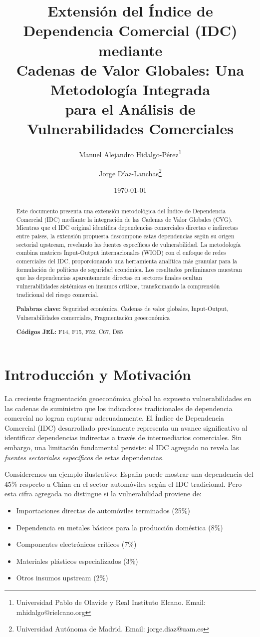\documentclass[12pt,a4paper]{article}
\title{\textbf{Extensión del Índice de Dependencia Comercial (IDC) mediante\\Cadenas de Valor Globales: Una Metodología Integrada\\para el Análisis de Vulnerabilidades Comerciales}}
\author{Manuel Alejandro Hidalgo-Pérez\thanks{Universidad Pablo de Olavide y Real Instituto Elcano. Email: mhidalgo@rielcano.org} \and Jorge Díaz-Lanchas\thanks{Universidad Autónoma de Madrid. Email: jorge.diaz@uam.es}}
\date{\today}
\begin{document}
\maketitle

\begin{abstract}
Este documento presenta una extensión metodológica del Índice de Dependencia Comercial (IDC) mediante la integración de las Cadenas de Valor Globales (CVG). Mientras que el IDC original identifica dependencias comerciales directas e indirectas entre países, la extensión propuesta descompone estas dependencias según su origen sectorial upstream, revelando las fuentes específicas de vulnerabilidad. La metodología combina matrices Input-Output internacionales (WIOD) con el enfoque de redes comerciales del IDC, proporcionando una herramienta analítica más granular para la formulación de políticas de seguridad económica. Los resultados preliminares muestran que las dependencias aparentemente directas en sectores finales ocultan vulnerabilidades sistémicas en insumos críticos, transformando la comprensión tradicional del riesgo comercial.

\textbf{Palabras clave:} Seguridad económica, Cadenas de valor globales, Input-Output, Vulnerabilidades comerciales, Fragmentación geoeconómica

\textbf{Códigos JEL:} F14, F15, F52, C67, D85
\end{abstract}

\section{Introducción y Motivación}

La creciente fragmentación geoeconómica global ha expuesto vulnerabilidades en las cadenas de suministro que los indicadores tradicionales de dependencia comercial no logran capturar adecuadamente. El Índice de Dependencia Comercial (IDC) desarrollado previamente \citep{hidalgo2024critical} representa un avance significativo al identificar dependencias indirectas a través de intermediarios comerciales. Sin embargo, una limitación fundamental persiste: el IDC agregado no revela las \textit{fuentes sectoriales específicas} de estas dependencias.

Consideremos un ejemplo ilustrativo: España puede mostrar una dependencia del 45\% respecto a China en el sector automóviles según el IDC tradicional. Pero esta cifra agregada no distingue si la vulnerabilidad proviene de:
\begin{itemize}
    \item Importaciones directas de automóviles terminados (25\%)
    \item Dependencia en metales básicos para la producción doméstica (8\%)
    \item Componentes electrónicos críticos (7\%)
    \item Materiales plásticos especializados (3\%)
    \item Otros insumos upstream (2\%)
\end{itemize}
\end{document}
